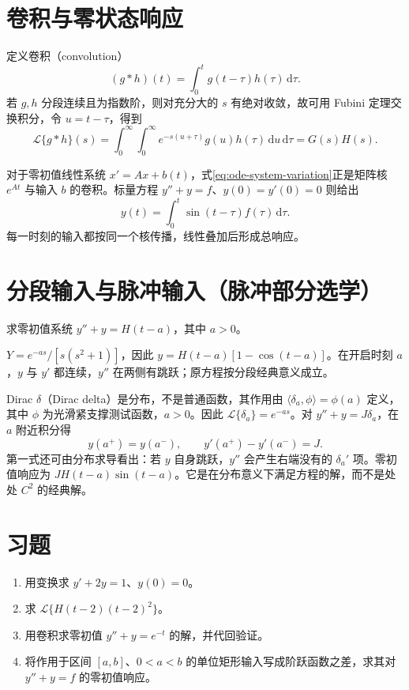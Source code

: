 \documentclass[UTF8,12pt,a4paper,fontset=fandol]{ctexbook}
\begin{document}
\section{卷积与零状态响应}
定义卷积（convolution）
\[
 (g*h)(t)=\int_0^t g(t-\tau)h(\tau)\,\mathrm d\tau.
\]
若 $g,h$ 分段连续且为指数阶，则对充分大的 $s$ 有绝对收敛，故可用 Fubini 定理交换积分，令 $u=t-\tau$，得到
\[
 \mathcal L\{g*h\}(s)
 =\int_0^\infty\int_0^\infty e^{-s(u+\tau)}g(u)h(\tau)\,\mathrm du\,\mathrm d\tau
 =G(s)H(s).
\]

对于零初值线性系统 $x'=Ax+b(t)$，式\eqref{eq:ode-system-variation}正是矩阵核 $e^{At}$ 与输入 $b$ 的卷积。标量方程 $y''+y=f$、$y(0)=y'(0)=0$ 则给出
\[
 y(t)=\int_0^t\sin(t-\tau)f(\tau)\,\mathrm d\tau.
\]
每一时刻的输入都按同一个核传播，线性叠加后形成总响应。

\section{分段输入与脉冲输入（脉冲部分选学）}
\begin{example}
求零初值系统 $y''+y=H(t-a)$，其中 $a>0$。
\end{example}
\begin{solve}
$Y=e^{-as}/[s(s^2+1)]$，因此 $y=H(t-a)[1-\cos(t-a)]$。在开启时刻 $a$，$y$ 与 $y'$ 都连续，$y''$ 在两侧有跳跃；原方程按分段经典意义成立。
\end{solve}

Dirac $\delta$（Dirac delta）是分布，不是普通函数，其作用由 $\langle\delta_a,\phi\rangle=\phi(a)$ 定义，其中 $\phi$ 为光滑紧支撑测试函数，$a>0$。因此 $\mathcal L\{\delta_a\}=e^{-as}$。对 $y''+y=J\delta_a$，在 $a$ 附近积分得
\[
 y(a^+)=y(a^-),\qquad y'(a^+)-y'(a^-)=J.
\]
第一式还可由分布求导看出：若 $y$ 自身跳跃，$y''$ 会产生右端没有的 $\delta_a'$ 项。零初值响应为 $JH(t-a)\sin(t-a)$。它是在分布意义下满足方程的解，而不是处处 $C^2$ 的经典解。

\section{习题}
\begin{enumerate}
 \item\label{ex:ode-laplace} 用变换求 $y'+2y=1$、$y(0)=0$。
 \item\label{ex:ode-delay} 求 $\mathcal L\{H(t-2)(t-2)^2\}$。
 \item 用卷积求零初值 $y''+y=e^{-t}$ 的解，并代回验证。
 \item 将作用于区间 $[a,b]$、$0<a<b$ 的单位矩形输入写成阶跃函数之差，求其对 $y''+y=f$ 的零初值响应。
\end{enumerate}
\end{document}
